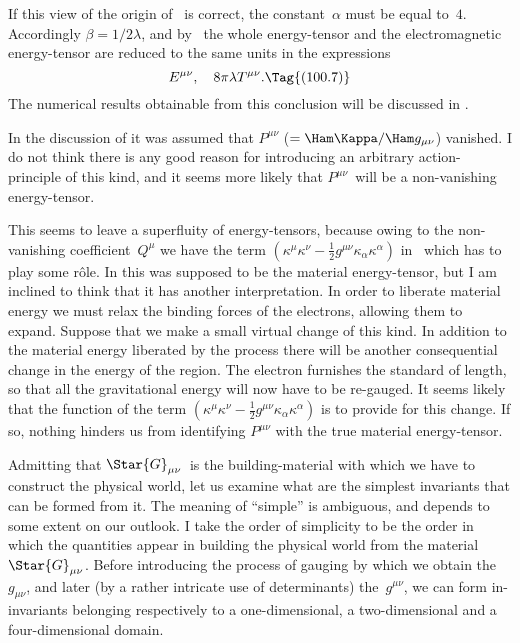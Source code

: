 \documentclass[12pt]{book}
\begin{document}
If this view of the origin of~ is correct, the constant~$\alpha$ must be
equal to~$4$. Accordingly $\beta = 1/2\lambda$, and by~ the whole energy-tensor
and the electromagnetic energy-tensor are reduced to the same units in the
expressions
\[
E^{\mu\nu},\quad
8\pi\lambda T^{\mu\nu}.
\Tag{(100.7)}
\]
The numerical results obtainable from this conclusion will be discussed in
.

In the discussion of  it was assumed that $P^{\mu\nu}$ ($= \Ham\Kappa/\Ham g_{\mu\nu}$) vanished.
I do not think there is any good reason for introducing an arbitrary action-principle
of this kind, and it seems more likely that $P^{\mu\nu}$~will be a non-vanishing
energy-tensor.

This seems to leave a superfluity of energy-tensors, because owing to the
non-vanishing coefficient~$Q^{\mu}$ we have the term $(\kappa^{\mu} \kappa^{\nu} - \frac{1}{2} g^{\mu\nu} \kappa_{\alpha} \kappa^{\alpha})$ in~
which has to play some rôle. In  this was supposed to be the material
energy-tensor, but I am inclined to think that it has another interpretation.
In order to liberate material energy we must relax the binding forces of the
electrons, allowing them to expand. Suppose that we make a small virtual
change of this kind. In addition to the material energy liberated by the
process there will be another consequential change in the energy of the
region. The electron furnishes the standard of length, so that all the gravitational
energy will now have to be re-gauged. It seems likely that the
function of the term $(\kappa^{\mu} \kappa^{\nu} - \frac{1}{2} g^{\mu\nu} \kappa_{\alpha} \kappa^{\alpha})$ is to provide for this change. If so,
nothing hinders us from identifying $P^{\mu\nu}$ with the true material energy-tensor.

%
%

Admitting that $\Star{G}_{\mu\nu}$~is the building-material with which we have to construct
the physical world, let us examine what are the simplest invariants
that can be formed from it. The meaning of ``simple'' is ambiguous, and
depends to some extent on our outlook. I take the order of simplicity to be
the order in which the quantities appear in building the physical world from
the material~$\Star{G}_{\mu\nu}$. Before introducing the process of gauging by which we
obtain the~$g_{\mu\nu}$, and later (by a rather intricate use of determinants) the~$g^{\mu\nu}$,
we can form in-invariants belonging respectively to a one-dimensional, a two-dimensional
%
and a four-dimensional domain.
\end{document}

